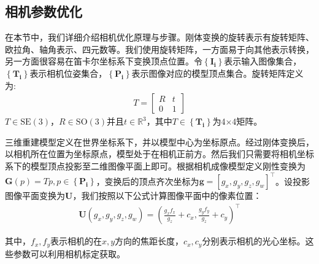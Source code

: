 \subsection{相机参数优化}
在本节中，我们详细介绍相机优化原理与步骤。刚体变换的旋转表示有旋转矩阵、欧拉角、轴角表示、四元数等。我们使用旋转矩阵，一方面易于向其他表示转换，另一方面很容易在笛卡尔坐标系下变换顶点位置。令$ \left \{ \mathbf{I_i} \right \} $表示输入图像集合，$\left \{ \mathbf{T_i} \right \}$表示相机位姿集合，$\left \{ \mathbf{P_i} \right \}$表示图像对应的模型顶点集合。旋转矩阵定义为:
\begin{align}
	T = \left[\begin{array}{cc}
		R & t \\
		0 & 1
	\end{array}\right]
\end{align}
$T \in \mathrm{SE} (3)$，$R \in \mathrm{SO}(3)$并且$t\in\mathbb{R}^3$，其中$T \in \left \{ \mathbf{T_i} \right \}$为4$\times$4矩阵。\par 
三维重建模型定义在世界坐标系下，并以模型中心为坐标原点。经过刚体变换后，以相机所在位置为坐标原点，模型处于在相机正前方。然后我们只需要将相机坐标系下的模型顶点投影至二维图像平面上即可。根据相机成像模型定义刚性变换为$\mathbf{G}(p)=Tp, p \in \left \{ \mathbf{P_i} \right \}$，变换后的顶点齐次坐标为$\mathbf{g}=[g_x, g_y, g_z,g_w]^\top$。设投影图像平面变换为$\mathbf{U}$，我们按照以下公式计算图像平面中的像素位置：
\begin{align}
\mathbf{U}\left(g_{x}, g_{y}, g_{z}, g_{w}\right)=\left(\frac{g_{x} f_{x}}{g_{z}}+c_{x}, \frac{g_{y} f_{y}}{g_{z}}+c_{y}\right)^{\top} \label{project}
\end{align}

其中，$f_x,f_y$表示相机的在$x,y$方向的焦距长度，$c_x,c_y$分别表示相机的光心坐标。这些参数可以利用相机标定获取。\par


